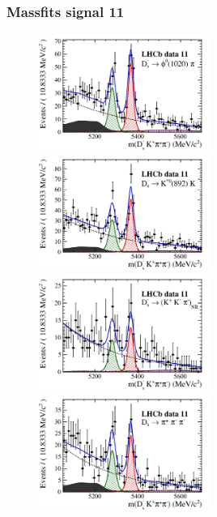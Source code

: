 \documentclass[]{beamer}
\begin{document}
\begin{frame}
\frametitle{Massfits signal 11}

\begin{figure}[h]
\includegraphics[height=!,width=0.5\textwidth]{plots/signal_y11_phipi.pdf}
\includegraphics[height=!,width=0.5\textwidth]{plots/signal_y11_KsK.pdf}\\
\includegraphics[height=!,width=0.5\textwidth]{plots/signal_y11_KKpi_NR.pdf}
\includegraphics[height=!,width=0.5\textwidth]{plots/signal_y11_pipipi.pdf}
\end{figure}

\end{frame}
\end{document}
